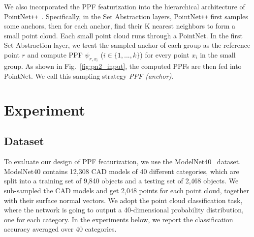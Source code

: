 \documentclass{article}
\begin{document}
We also incorporated the PPF featurization into the hierarchical architecture of PointNet\texttt{++}~\cite{qi2017pointnet2}. Specifically, in the Set Abstraction layers, PointNet\texttt{++} first samples some anchors, then for each anchor, find their K nearest neighbors to form a small point cloud. Each small point cloud runs through a PointNet. In the first Set Abstraction layer, we treat the sampled anchor of each group as the reference point $r$ and compute PPF $\psi_{r, x_i}$ ($i\in\{1,..., k\}$) for every point $x_i$ in the small group. As shown in Fig.~\ref{fig:pn2_input}, the computed PPFs are then fed into PointNet. We call this sampling strategy \textit{PPF (anchor)}.

\section{Experiment}

\subsection{Dataset}

To evaluate our design of PPF featurization, we use the ModelNet40~\cite{Wu2015-3dshapenet} dataset. ModelNet40 contains 12,308 CAD models of 40 different categories, which are split into a training set of 9,840 objects and a testing set of 2,468 objects. We sub-sampled the CAD models and get 2,048 points for each point cloud, together with their surface normal vectors. We adopt the point cloud classification task, where the network is going to output a 40-dimensional probability distribution, one for each category. In the experiments below, we report the classification accuracy averaged over 40 categories. 
\end{document}
